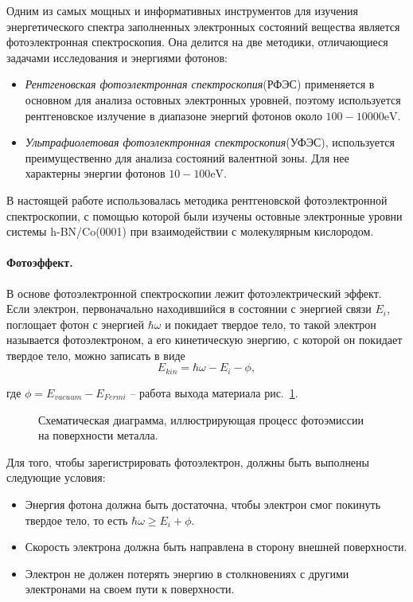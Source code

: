Одним из самых мощных и информативных инструментов для изучения 
энергетического спектра заполненных электронных состояний вещества
является фотоэлектронная спектроскопия. Она делится на две методики,
отличающиеся задачами исследования и энергиями фотонов:
	\vspace{15pt}
		\begin{itemize}
			\item \textit{Рентгеновская фотоэлектронная спектроскопия}(РФЭС) 
			применяется в основном для анализа остовных электронных уровней,
			поэтому используется рентгеновское излучение в диапазоне энергий
			фотонов около $100-10 000 \si{\eV}$.
			\item \textit{Ультрафиолетовая фотоэлектронная спектроскопия}(УФЭС),
			используется преимущественно для анализа состояний валентной зоны. Для нее характерны энергии фотонов $10-100 \si{\eV}$.
		\end{itemize}
	\vspace{15pt}


В настоящей работе использовалась методика рентгеновской 
фотоэлектронной спектроскопии, с помощью которой были изучены остовные
электронные уровни системы h-BN/Co(0001) при взаимодействии с 
молекулярным кислородом.

\paragraph{Фотоэффект.}
В основе фотоэлектронной спектроскопии лежит фотоэлектрический эффект.
Если электрон, первоначально находившийся в состоянии с энергией
связи $E_i$, поглощает фотон с энергией $\hbar\omega$ и покидает 
твердое тело, то такой электрон называется фотоэлектроном, а его
кинетическую энергию, с которой он покидает твердое тело, можно записать
в виде
	\begin{equation}
		E_{kin}=\hbar\omega-E_i-\phi,
	\end{equation}

где $\phi=E_{vacuum}-E_{Fermi}$ -- работа выхода материала рис.~\ref{pic:XPS_diagram}.
	\begin{figure}[!ht]
		\caption{Схематическая диаграмма, иллюстрирующая процесс фотоэмиссии
		на поверхности металла.}
		\label{pic:XPS_diagram}
	\end{figure}


Для того, чтобы зарегистрировать фотоэлектрон, должны быть выполнены
следующие условия:
	\vspace{15pt}
		\begin{itemize}
			\item Энергия фотона должна быть достаточна, чтобы электрон смог
			покинуть твердое тело, то есть $\hbar\omega\geq E_i+\phi$.
			\item Скорость электрона должна быть направлена в сторону внешней 
			поверхности.
			\item Электрон не должен потерять энергию в столкновениях с другими
			электронами на своем пути к поверхности.
		\end{itemize}
	\vspace{15pt}


